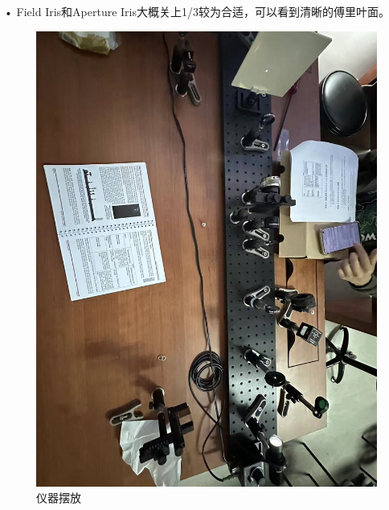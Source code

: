 \documentclass{ctexart}
\begin{document}
• Field Iris和Aperture Iris大概关上1/3较为合适，可以看到清晰的傅里叶面。
\begin{figure}[H]
  \centering
  \begin{minipage}[b]{0.2\textwidth}
    \centering
    \includegraphics[width=\textwidth]{pictures/微信图片_20241010201028.jpg}
    \caption{仪器摆放}
  \end{minipage}
  \hspace{0.05\textwidth} %
  \begin{minipage}[b]{0.2\textwidth}
    \centering

\end{minipage}
\end{figure}
\end{document}
